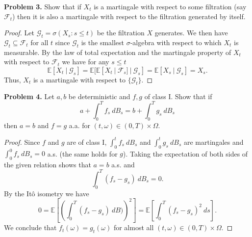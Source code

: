 \documentclass[11pt,letterpaper]{report}
\newcommand{\mcal}[1]{\mathcal{#1}}
\newcommand{\E}{\mathbb{E}}
\begin{document}
\noindent\textbf{Problem 3. }
Show that if $X_t$ is a martingale with respect to some filtration (say $\mcal{F}_t$) then it is also a martingale with respect to the filtration generated by itself.
\begin{proof}
	Let $\mcal{G}_t = \sigma(X_s: s\leq t)$ be the filtration $X$ generates. We then have $\mcal{G}_t \subseteq \mcal{F}_t$ for all $t$ since $\mcal{G}_t$ is the smallest $\sigma$-algebra with respect to which $X_t$ is measurable. By the law of total expectation and the martingale property of $X_t$ with respect to $\mcal{F}_t$ we have for any $s\leq t$
	\[
	\E[X_t\ |\ \mcal{G}_s] = \E[\E[X_t\ |\ \mcal{F}_s]\ |\ \mcal{G}_s] = \E[X_s\ |\ \mcal{G}_s] = X_s.
	\]
	Thus, $X_t$ is a martingale with respect to $\{\mcal{G}_t\}$.
\end{proof}


\noindent\textbf{Problem 4. }
Let $a,b$ be deterministic and $f,g$ of class I. Show that if
\begin{equation}\label{ints}
a + \int_0^Tf_s\ dB_s = b+ \int_0^Tg_s\ dB_s
\end{equation}
then $a = b$ and $f = g$ a.a. for $(t, \omega) \in (0, T)\times \Omega$.
\begin{proof}
	Since $f$ and $g$ are of class I, $\int_0^t f_s\ dB_s$ and $\int_0^t g_s\ dB_s$ are martingales and $\int_0^0 f_s\ dB_s = 0$ a.s. (the same holds for $g$). Taking the expectation of both sides of the given relation shows that $a = b$ a.s. and
	\[
	\int_0^T(f_s - g_s)\ dB_s = 0.
	\]
	By the It\^o isometry we have
	\[
	0 = \E\left[\left(\int_0^T(f_s - g_s)\ dB)\right)^2\right] = \E\left[\int_0^T(f_s - g_s)^2\ ds\right].
	\]
	We conclude that $f_t(\omega) = g_t(\omega)$ for almost all $(t, \omega)\in (0, T)\times \Omega$.
\end{proof}
\end{document}
